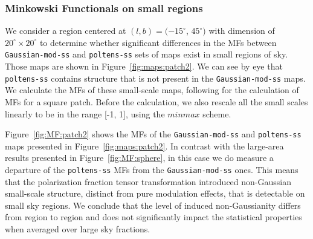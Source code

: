 \documentclass[twocolumn]{aastex631}
\newcommand{\giuse}[1]{\textcolor{orange}{(GP: #1)}}
\begin{document}
\subsubsection{Minkowski Functionals on small regions}
We consider a region centered at $(l, b) = (-15^{\circ}$, $45^{\circ})$ with dimension of $20^{\circ}\times20^{\circ}$ to determine whether significant differences in the MFs between \texttt{Gaussian-mod-ss} and \texttt{poltens-ss} sets of maps exist in small regions of sky. Those maps are shown in Figure~\ref{fig:maps:patch2}. We can see by eye that \texttt{poltens-ss} contains structure that is not present in the \texttt{Gaussian-mod-ss} maps. We calculate the MFs of these small-scale maps, following \cite{Mantz:2008} for the calculation of MFs for a square patch. Before the calculation, we also rescale all the small scales linearly to be in the range [-1, 1], using the $minmax$ scheme.

Figure~\ref{fig:MF:patch2} shows the MFs of the \texttt{Gaussian-mod-ss} and \texttt{poltens-ss} maps presented in Figure~\ref{fig:maps:patch2}. In contrast with the large-area results presented in Figure~\ref{fig:MF:sphere}, in this case we do measure a departure of the \texttt{poltens-ss} MFs from the \texttt{Gaussian-mod-ss} ones. %
This means that the polarization fraction tensor transformation introduced non-Gaussian small-scale structure, distinct from pure modulation effects, that is detectable on small sky regions. 
We conclude that the level of induced non-Gaussianity differs from region to region and does not significantly impact the statistical properties when averaged over large sky fractions.

\end{document}
